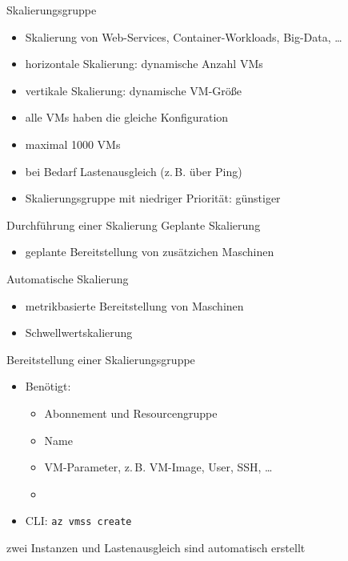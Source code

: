 \begin{flashcard}[Definition]{Skalierungsgruppe}
    \begin{itemize}
        \item Skalierung von Web-Services, Container-Workloads, Big-Data, \ldots
        \item horizontale Skalierung: dynamische Anzahl VMs
        \item vertikale Skalierung: dynamische VM-Größe
        \item alle VMs haben die gleiche Konfiguration
        \item maximal 1000 VMs
        \item bei Bedarf Lastenausgleich (z.\,B. über Ping)
        \item Skalierungsgruppe mit niedriger Priorität: günstiger
    \end{itemize}
\end{flashcard}

\begin{flashcard}[Definition]{Durchführung einer Skalierung}
    Geplante Skalierung
    \begin{itemize}
        \item geplante Bereitstellung von zusätzichen Maschinen
    \end{itemize}
    \vspace{1cm}
    Automatische Skalierung
    \begin{itemize}
        \item metrikbasierte Bereitstellung von Maschinen
        \item Schwellwertskalierung
    \end{itemize}

\end{flashcard}

\begin{flashcard}[Definition]{Bereitstellung einer Skalierungsgruppe}
    \begin{itemize}
        \item Benötigt:
            \begin{itemize}
                \item Abonnement und Resourcengruppe
                \item Name
                \item VM-Parameter, z.\,B. VM-Image, User, SSH, \ldots
                \item
            \end{itemize}
        \item CLI: \texttt{az vmss create}
    \end{itemize}
    zwei Instanzen und Lastenausgleich sind automatisch erstellt
\end{flashcard}

